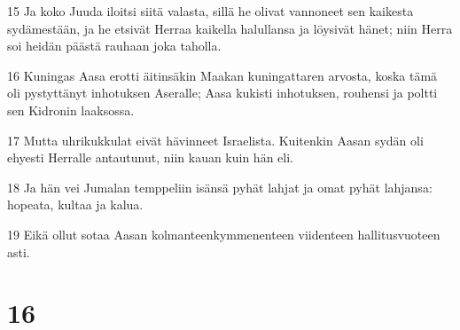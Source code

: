 \par 15 Ja koko Juuda iloitsi siitä valasta, sillä he olivat vannoneet sen kaikesta sydämestään, ja he etsivät Herraa kaikella halullansa ja löysivät hänet; niin Herra soi heidän päästä rauhaan joka taholla.
\par 16 Kuningas Aasa erotti äitinsäkin Maakan kuningattaren arvosta, koska tämä oli pystyttänyt inhotuksen Aseralle; Aasa kukisti inhotuksen, rouhensi ja poltti sen Kidronin laaksossa.
\par 17 Mutta uhrikukkulat eivät hävinneet Israelista. Kuitenkin Aasan sydän oli ehyesti Herralle antautunut, niin kauan kuin hän eli.
\par 18 Ja hän vei Jumalan temppeliin isänsä pyhät lahjat ja omat pyhät lahjansa: hopeata, kultaa ja kalua.
\par 19 Eikä ollut sotaa Aasan kolmanteenkymmenenteen viidenteen hallitusvuoteen asti.

\chapter{16}

